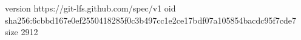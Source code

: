 version https://git-lfs.github.com/spec/v1
oid sha256:6cbbd167e0ef2550418285f0c3b497cc1e2ce17bdf07a105854bacdc95f7cde7
size 2912
